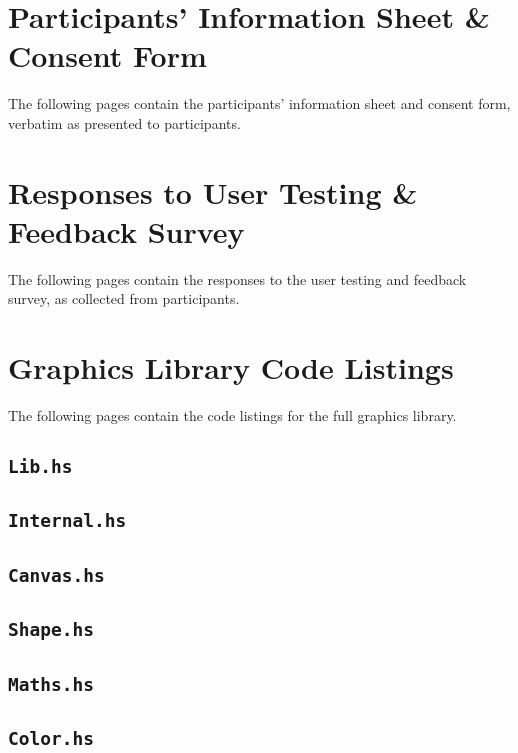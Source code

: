 \documentclass[../main.tex]{subfiles}
\begin{document}
\appendix
    \chapter{Participants' Information Sheet \& Consent Form} \label{app:consent}
        The following pages contain the participants' information sheet and consent
            form, verbatim as presented to participants.

        \begin{center}
            
        \end{center}

    \chapter{Responses to User Testing \& Feedback Survey} \label{app:feedback}
        The following pages contain the responses to the user testing and feedback
            survey, as collected from participants.

    \chapter{Graphics Library Code Listings} \label{app:code}
        The following pages contain the code listings for the full graphics library.
        \section*{\texttt{Lib.hs}}
            
        \section*{\texttt{Internal.hs}}
            
        \section*{\texttt{Canvas.hs}}
            
        \section*{\texttt{Shape.hs}}
            
        \section*{\texttt{Maths.hs}}
            
        \section*{\texttt{Color.hs}}
            
\end{document}
